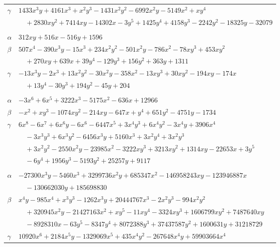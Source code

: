 \documentclass[11pt]{article}
\begin{document}
\begin{longtable}{@{}ll@{}}
$\gamma$ & $1433x^{3}y+4161x^{3}+x^{2}y^{3}-1431x^{2}y^{2}-6992x^{2}y-5149x^{2}+xy^{4}$\\
 & $\quad +2830xy^{2}+7414xy-14302x-3y^{5}+1425y^{4}+4158y^{3}-2242y^{2}-18325y-32079$\\
\addlinespace[3pt]
\multicolumn{2}{@{}l}{$\{i,j\}=\{96,97\}$, $k_{ij}=2^{3}\cdot 3^{3}\cdot 5^{2}$}\\
$\alpha$ & $312xy+516x-516y+1596$\\
$\beta$ & $507x^{4}-390x^{3}y-15x^{3}+234x^{2}y^{2}-501x^{2}y-786x^{2}-78xy^{3}+453xy^{2}$\\
 & $\quad +270xy+639x+39y^{4}-129y^{3}+156y^{2}+363y+1311$\\
$\gamma$ & $-13x^{3}y-2x^{3}+13x^{2}y^{2}-30x^{2}y-358x^{2}-13xy^{3}+30xy^{2}-194xy-174x$\\
 & $\quad +13y^{4}-30y^{3}+194y^{2}-45y+204$\\
\addlinespace[3pt]
\multicolumn{2}{@{}l}{$\{i,j\}=\{97,105\}$, $k_{ij}=2^{5}\cdot 3^{4}\cdot 13$}\\
$\alpha$ & $-3x^{6}+6x^{5}+3222x^{3}-5175x^{2}-636x+12966$\\
$\beta$ & $-x^{2}+xy^{3}-1074xy^{2}-214xy-647x+y^{4}+651y^{2}-4751y-1734$\\
$\gamma$ & $6x^{8}-6x^{7}+6x^{6}y-6x^{6}-6447x^{5}+3x^{4}y^{3}+6x^{4}y^{2}-3x^{4}y+3906x^{4}$\\
 & $\quad -3x^{3}y^{3}+6x^{3}y^{2}-6456x^{3}y+5160x^{3}+3x^{2}y^{4}+3x^{2}y^{3}$\\
 & $\quad +3x^{2}y^{2}-2550x^{2}y-23985x^{2}-3222xy^{3}+3213xy^{2}+1314xy-22653x+3y^{5}$\\
 & $\quad -6y^{4}+1956y^{3}-5193y^{2}+25257y+9117$\\
\addlinespace[3pt]
\multicolumn{2}{@{}l}{$\{i,j\}=\{97,140\}$, $k_{ij}=2^{7}\cdot 3^{3}\cdot 5^{3}\cdot 7^{2}\cdot 13$}\\
$\alpha$ & $-27300x^{3}y-5460x^{3}+3299736x^{2}y+685347x^{2}-146958243xy-123946887x$\\
 & $\quad -130662030y+185698830$\\
$\beta$ & $x^{4}y-985x^{4}+x^{3}y^{3}-1262x^{3}y+20444767x^{3}-2x^{2}y^{3}-994x^{2}y^{2}$\\
 & $\quad +320945x^{2}y-21427163x^{2}+xy^{5}-11xy^{4}-3324xy^{3}+1606799xy^{2}+7487640xy$\\
 & $\quad -8928310x-63y^{5}-8347y^{4}+8072388y^{3}+37437587y^{2}+1600631y+31218729$\\
$\gamma$ & $10920x^{6}+2184x^{5}y-1329069x^{5}+435x^{4}y^{2}-267648x^{4}y+59903664x^{4}$\\

\end{longtable}
\end{document}
